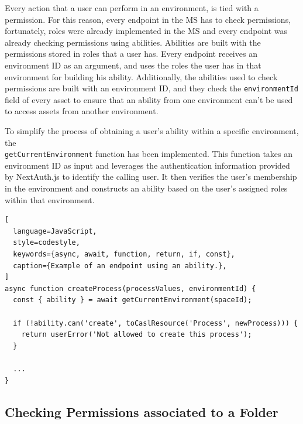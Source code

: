 Every action that a user can perform in an environment, is tied with a permission.
For this reason, every endpoint in the MS has to check permissions, fortunately, roles
were already implemented in the MS and every endpoint was already checking permissions
using abilities.
Abilities are built with the permissions stored in roles that a user has.
Every endpoint receives an environment ID as an argument,
and uses the roles the user has in that environment for building his ability.
Additionally, the abilities used to check permissions are built with an environment ID,
and they check the \lstinline{environmentId} field of every asset to ensure that an
ability from one environment can't be used to access assets from another environment.

To simplify the process of obtaining a user's ability within a specific environment,
the \\ \lstinline{getCurrentEnvironment} function has been implemented.
This function takes an environment ID as input and leverages the authentication information provided by NextAuth.js 
to identify the calling user.
It then verifies the user's membership in the environment and constructs an ability based
on the user's assigned roles within that environment.

\begin{lstlisting}[
  language=JavaScript,
  style=codestyle,
  keywords={async, await, function, return, if, const},
  caption={Example of an endpoint using an ability.},
]
async function createProcess(processValues, environmentId) {
  const { ability } = await getCurrentEnvironment(spaceId);

  if (!ability.can('create', toCaslResource('Process', newProcess))) {
    return userError('Not allowed to create this process');
  }

  ...
}
\end{lstlisting}

\subsection{Checking Permissions associated to a Folder}


